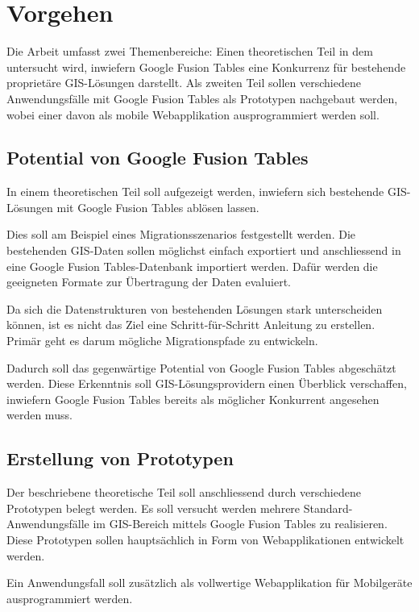 \section{Vorgehen}
Die Arbeit umfasst zwei Themenbereiche: Einen theoretischen Teil in dem untersucht wird, inwiefern Google Fusion Tables eine Konkurrenz für bestehende proprietäre \gls{GIS}-Lösungen darstellt. Als zweiten Teil sollen verschiedene Anwendungsfälle mit Google Fusion Tables als Prototypen nachgebaut werden, wobei einer davon als mobile Webapplikation ausprogrammiert werden soll.

\subsection{Potential von Google Fusion Tables}
In einem theoretischen Teil soll aufgezeigt werden, inwiefern sich bestehende \gls{GIS}-Lösungen mit Google Fusion Tables ablösen lassen.

Dies soll am Beispiel eines Migrationsszenarios festgestellt werden. Die bestehenden \gls{GIS}-Daten sollen möglichst einfach exportiert und anschliessend in eine Google Fusion Tables-Datenbank importiert werden. Dafür werden die geeigneten Formate zur Übertragung der Daten evaluiert.

Da sich die Datenstrukturen von bestehenden Lösungen stark unterscheiden können, ist es nicht das Ziel eine Schritt-für-Schritt Anleitung zu erstellen. Primär geht es darum mögliche Migrationspfade zu entwickeln.

Dadurch soll das gegenwärtige Potential von Google Fusion Tables abgeschätzt werden. Diese Erkenntnis soll \gls{GIS}-Lösungsprovidern einen Überblick verschaffen, inwiefern Google Fusion Tables bereits als möglicher Konkurrent angesehen werden muss.

\subsection{Erstellung von Prototypen}
Der beschriebene theoretische Teil soll anschliessend durch verschiedene Prototypen belegt werden. Es soll versucht werden mehrere Standard-Anwendungsfälle im GIS-Bereich mittels Google Fusion Tables zu realisieren. Diese Prototypen sollen hauptsächlich in Form von Webapplikationen entwickelt werden.

Ein Anwendungsfall soll zusätzlich als vollwertige Webapplikation für Mobilgeräte ausprogrammiert werden.

